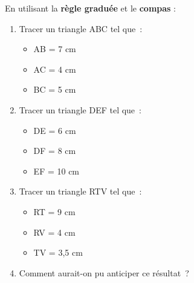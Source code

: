 \documentclass[activite]{thedocument}
\begin{document}
    \noindent En utilisant la {\bfseries règle graduée} et le {\bfseries compas} :
    \begin{enumerate}
        \item Tracer un triangle {\sf ABC} tel que~:
        \begin{itemize}
            \item AB = 7 cm
            \item AC = 4 cm
            \item BC = 5 cm
        \end{itemize}\vskip60pt
        \item Tracer un triangle {\sf DEF} tel que~:
        \begin{itemize}
            \item DE = 6 cm
            \item DF = 8 cm
            \item EF = 10 cm
        \end{itemize}\vskip60pt
        \item Tracer un triangle {\sf RTV} tel que~:
        \begin{itemize}
            \item RT = 9 cm
            \item RV = 4 cm
            \item TV = 3,5 cm
        \end{itemize}\vskip60pt
        \item Comment aurait-on pu anticiper ce résultat~?\dotedline\dotedline
    \end{enumerate}
\end{document}
